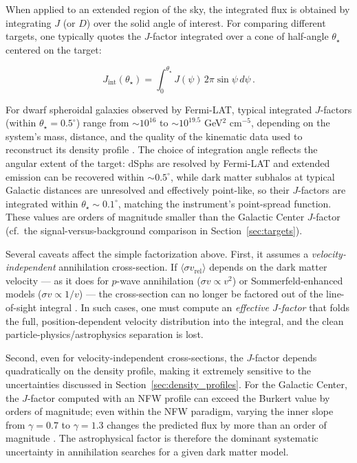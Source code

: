 When applied to an extended region of the sky, the integrated flux is obtained by integrating $J$ (or $D$) over the solid angle of interest.
For comparing different targets, one typically quotes the $J$-factor integrated over a cone of half-angle $\theta_\star$ centered on the target:

\begin{equation}
	J_\text{int}(\theta_\star) = \int_0^{\theta_\star} J(\psi) \, 2\pi \sin\psi \, d\psi \,.
	\label{eq:jfactor_int}
\end{equation}

For dwarf spheroidal galaxies observed by Fermi-LAT, typical integrated $J$-factors (within $\theta_\star = 0.5^\circ$) range from $\sim 10^{16}$ to $\sim 10^{19.5}$ GeV$^2$ cm$^{-5}$, depending on the system's mass, distance, and the quality of the kinematic data used to reconstruct its density profile \cite{Hooper:2024,Bonnivard:2015xpq}.
The choice of integration angle reflects the angular extent of the target: dSphs are resolved by Fermi-LAT and extended emission can be recovered within $\sim 0.5^\circ$, while dark matter subhalos at typical Galactic distances are unresolved and effectively point-like, so their $J$-factors are integrated within $\theta_\star \sim 0.1^\circ$, matching the instrument's point-spread function.
These values are orders of magnitude smaller than the Galactic Center $J$-factor (cf.\ the signal-versus-background comparison in Section~\ref{sec:targets}).

Several caveats affect the simple factorization above.
First, it assumes a \textit{velocity-independent} annihilation cross-section.
If $\langle \sigma v_\text{rel} \rangle$ depends on the dark matter velocity --- as it does for $p$-wave annihilation ($\sigma v \propto v^2$) or Sommerfeld-enhanced models ($\sigma v \propto 1/v$) --- the cross-section can no longer be factored out of the line-of-sight integral \cite{Cirelli:2024ssz}.
In such cases, one must compute an \textit{effective $J$-factor} that folds the full, position-dependent velocity distribution into the integral, and the clean particle-physics/astrophysics separation is lost.

Second, even for velocity-independent cross-sections, the $J$-factor depends quadratically on the density profile, making it extremely sensitive to the uncertainties discussed in Section~\ref{sec:density_profiles}.
For the Galactic Center, the $J$-factor computed with an NFW profile can exceed the Burkert value by orders of magnitude; even within the NFW paradigm, varying the inner slope from $\gamma = 0.7$ to $\gamma = 1.3$ changes the predicted flux by more than an order of magnitude \cite{Hooper:2024}.
The astrophysical factor is therefore the dominant systematic uncertainty in annihilation searches for a given dark matter model.

